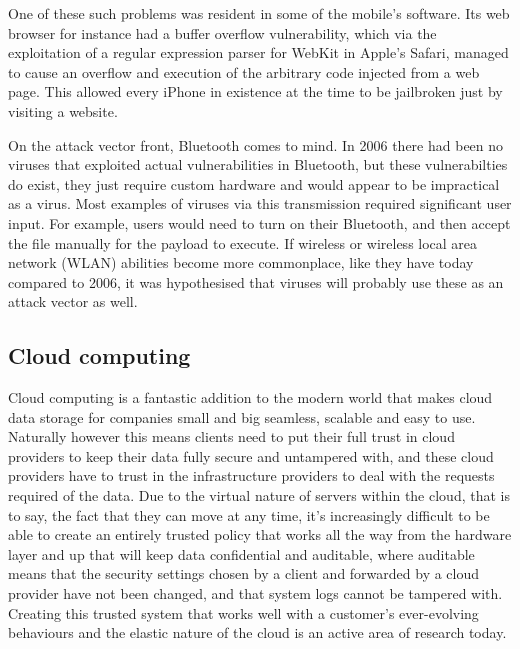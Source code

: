 \documentclass[a4paper, 11pt]{article}
\begin{document}
One of these such problems was resident in some of the mobile's software. Its web browser for instance had a buffer overflow vulnerability, which via the exploitation of a regular expression parser for WebKit in Apple's Safari, managed to cause an overflow and execution of the arbitrary code injected from a web page. \cite{ref:dunham2008mobile} This allowed every iPhone in existence at the time to be jailbroken just by visiting a website.

On the attack vector front, Bluetooth comes to mind. In 2006 there had been no viruses that exploited actual vulnerabilities in Bluetooth, but these vulnerabilties do exist, they just require custom hardware and would appear to be impractical as a virus. \cite{ref:toyssy2006malicious} Most examples of viruses via this transmission required significant user input. For example, users would need to turn on their Bluetooth, and then accept the file manually for the payload to execute. If wireless or wireless local area network (WLAN) abilities become more commonplace, like they have today compared to 2006, it was hypothesised that viruses will probably use these as an attack vector as well. \cite{ref:toyssy2006malicious}

\subsection{Cloud computing}
Cloud computing is a fantastic addition to the modern world that makes cloud data storage for companies small and big seamless, scalable and easy to use. \cite{ref:jang2014survey} Naturally however this means clients need to put their full trust in cloud providers to keep their data fully secure and untampered \cite{ref:zhang2010cloud} with, and these cloud providers have to trust in the infrastructure providers to deal with the requests required of the data. Due to the virtual nature of servers within the cloud, that is to say, the fact that they can move at any time, it's increasingly difficult to be able to create an entirely trusted policy that works all the way from the hardware layer and up that will keep data confidential and auditable, where auditable means that the security settings chosen by a client and forwarded by a cloud provider have not been changed, and that system logs cannot be tampered with. \cite{ref:zhang2010cloud} Creating this trusted system that works well with a customer's ever-evolving behaviours and the elastic nature of the cloud is an active area of research today.
\end{document}

